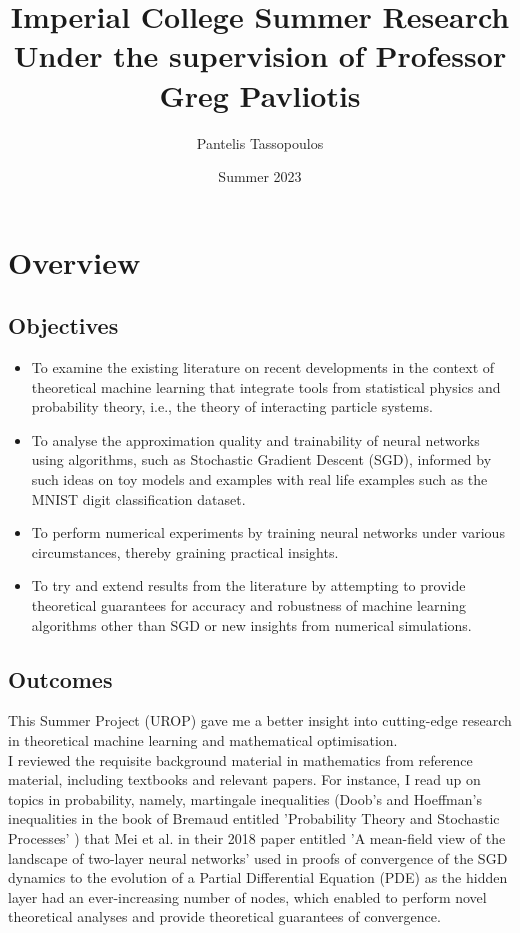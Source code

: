 \documentclass{article}
\title{\Huge Imperial College Summer Research \\ 
\huge Under the supervision of Professor Greg Pavliotis}
\author{\Large Pantelis Tassopoulos}
\date{\Large Summer 2023}
\begin{document}
\maketitle
\newpage

\tableofcontents 
\newpage 

\section{Overview}

\subsection{Objectives}

\begin{itemize}
	\item	To examine the existing literature on recent developments in the context of theoretical machine learning that integrate tools from statistical physics and probability theory, i.e., the theory of interacting particle systems.
	\item 	To analyse the approximation quality and trainability of neural networks using algorithms, such as Stochastic Gradient Descent (SGD), informed by such ideas on toy models and examples with real life examples such as the MNIST digit classification dataset.
	\item 	To perform numerical experiments by training neural networks under various circumstances, thereby graining practical insights. 
	\item 	To try and extend results from the literature by attempting to provide theoretical guarantees for accuracy and robustness of machine learning algorithms other than SGD or new insights from numerical simulations. 

\end{itemize}

\subsection{Outcomes}

This Summer Project (UROP) gave me a better insight into cutting-edge research in theoretical machine learning and mathematical optimisation.\\ 

I reviewed the requisite background material in mathematics from reference material, including textbooks and relevant papers. For instance, I read up on topics in probability, namely, martingale inequalities (Doob's and Hoeffman's inequalities in the book of Bremaud entitled 'Probability Theory and Stochastic Processes' \cite{bremaud2020probability}) that Mei et al. in their 2018 paper entitled 'A mean-field view of the landscape of two-layer neural networks' used in proofs of convergence of the SGD dynamics to the evolution of a Partial Differential Equation (PDE) as the hidden layer had an ever-increasing number of nodes, which enabled to perform novel theoretical analyses and provide theoretical guarantees of convergence.\\
\end{document}
